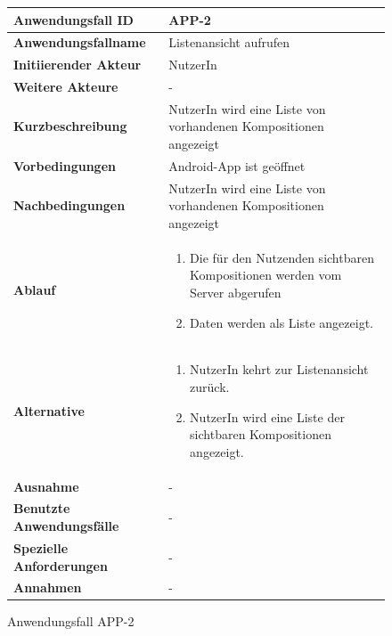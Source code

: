 \begin{figure}[h]
	\centering
	\begin{tabularx}{\textwidth}{ X | X }
		\textbf{Anwendungsfall ID} & APP-2 \\ \hline
		\textbf{Anwendungsfallname} & Listenansicht aufrufen \\ \hline
		\textbf{Initiierender Akteur} & NutzerIn \\ \hline
		\textbf{Weitere Akteure} & -  \\ \hline
		\textbf{Kurzbeschreibung} & NutzerIn wird eine Liste von vorhandenen Kompositionen angezeigt \\ \hline
		\textbf{Vorbedingungen} & Android-App ist geöffnet  \\ \hline
		\textbf{Nachbedingungen} & NutzerIn wird eine Liste von vorhandenen Kompositionen angezeigt  \\ \hline
		\textbf{Ablauf} &
		\begin{enumerate}
			\item Die für den Nutzenden sichtbaren Kompositionen werden vom Server abgerufen
			\item Daten werden als Liste angezeigt.
		\end{enumerate} \\ \hline
		\textbf{Alternative} &
		\begin{enumerate}
			\item NutzerIn kehrt zur Listenansicht zurück.
			\item NutzerIn wird eine Liste der sichtbaren Kompositionen angezeigt.
		\end{enumerate}  \\ \hline
		\textbf{Ausnahme} &
		-  \\ \hline
		\textbf{Benutzte Anwendungsfälle} & - \\ \hline
		\textbf{Spezielle Anforderungen} & - \\ \hline
		\textbf{Annahmen} & -
	\end{tabularx}
	\caption{Anwendungsfall APP-2}
	\label{fig:anwendungsfall-app-tabelle-APP-2}
\end{figure}

\newpage


